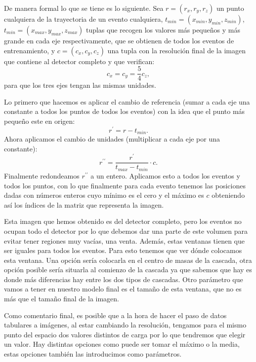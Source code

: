 \documentclass[a4paper,12pt,twoside,titlepage]{article}
\begin{document}
De manera formal lo que se tiene es lo siguiente. Sea ${r} = (r_x, r_y, r_z)$ un punto cualquiera de la trayectoria de un evento cualquiera, $t_{min} = (x_{min}, y_{min}, z_{min})$, $t_{min} = (x_{max}, y_{max}, z_{max})$ tuplas que recogen los valores más pequeños y más grande en cada eje respectivamente, que se obtienen de todos los eventos de entrenamiento, y $c = (c_x, c_y, c_z)$ una tupla con la resolución final de la imagen que contiene al detector completo y que verifican:
\begin{equation}
  \label{eq:resolucion}
  c_x = c_y = \frac{5}{4}c_z,
\end{equation}
para que los tres ejes tengan las mismas unidades.

Lo primero que hacemos es aplicar el cambio de referencia (sumar a cada eje una constante a todos los puntos de todos los eventos) con la idea que el punto más pequeño este en origen:
\begin{equation}
  {r}^\prime = {r} - t_{min}.
\end{equation}
Ahora aplicamos el cambio de unidades (multiplicar a cada eje por una constante):
\begin{equation}
  {r}^{\prime\prime} = \frac{{r}^\prime}{t_{max} - t_{min}} \cdot c.
\end{equation}
Finalmente redondeamos $r^{\prime\prime}$ a un entero. Aplicamos esto a todos los eventos y todos los puntos, con lo que finalmente para cada evento tenemos las posiciones dadas con números enteros cuyo mínimo es el cero y el máximo es $c$ obteniendo así los índices de la matriz que representa la imagen.

Esta imagen que hemos obtenido es del detector completo, pero los eventos no ocupan todo el detector por lo que debemos dar una parte de este volumen para evitar tener regiones muy vacías, una venta. Además, estas ventanas tienen que ser iguales para todos los eventos. Para esto tenemos que ver dónde colocamos esta ventana. Una opción sería colocarla en el centro de masas de la cascada, otra opción posible sería situarla al comienzo de la cascada ya que sabemos que hay es donde más diferencias hay entre los dos tipos de cascadas. Otro parámetro que vamos a tener en nuestro modelo final es el tamaño de esta ventana, que no es más que el tamaño final de la imagen.

Como comentario final, es posible que a la hora de hacer el paso de datos tabulares a imágenes, al estar cambiando la resolución, tengamos para el mismo punto del espacio dos valores distintos de carga por lo que tendremos que elegir un valor. Hay distintas opciones como puede ser tomar el máximo o la media, estas opciones también las introducimos como parámetros.
\end{document}
